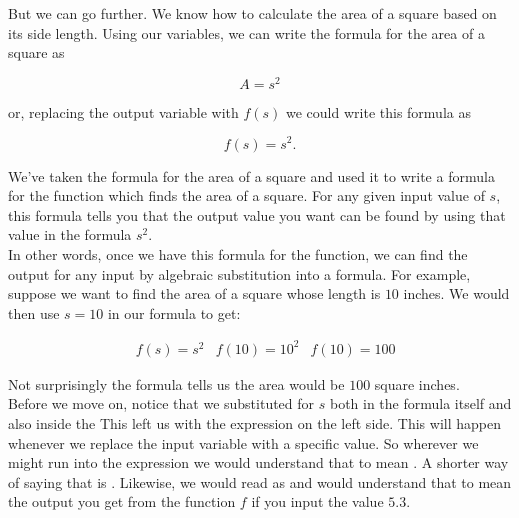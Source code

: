But we can go further. We know how to calculate the area of a square based on its side length.  Using our variables, we can write the formula for the area of a square as

$$ A = s^2 $$

or, replacing the output variable with $f(s)$ we could write this formula as

$$ f(s) = s^2 .$$

We've taken the formula for the area of a square and used it to write a formula for the function which finds the area of a square. For any given input value of $s$, this formula tells you that the output value you want can be found by using that value in the formula $s^2$.\\

In other words, once we have this formula for the function, we can find the output for any input by algebraic substitution into a formula. For example, suppose we want to find the area of a square whose length is $10$ inches. We would then use $s = 10$ in our formula to get:

\begin{align*}
	& f(s)=s^2
	& f(10)=10^2
	& f(10)=100
\end{align*}

Not surprisingly the formula tells us the area would be $100$ square inches.\\

Before we move on, notice that we substituted for $s$ both in the formula itself and also inside the   This left us with the expression  on the left side. This will happen whenever we replace the input variable with a specific value. So wherever we might run into the expression
 we would understand that to mean .  A shorter way of saying that is . Likewise, we would read  as  and would understand that to mean the output you get from the function $f$ if you input the value $5.3$.



